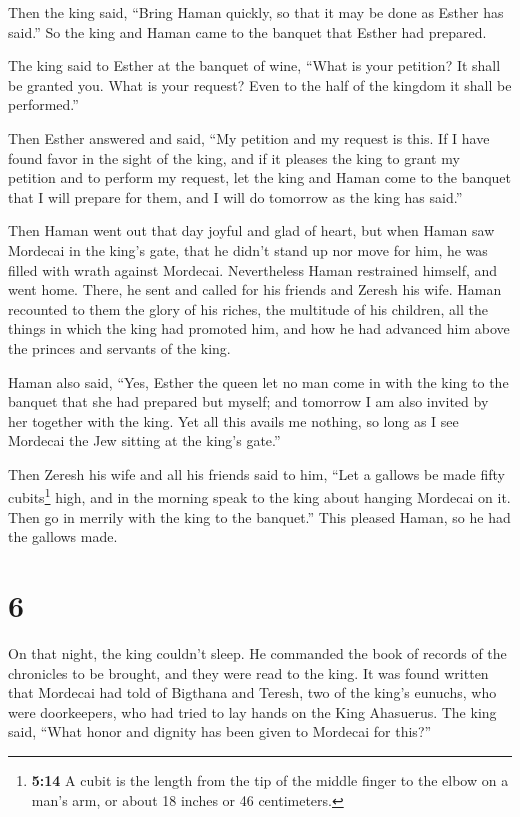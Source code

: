 Then the king said, ``Bring Haman quickly, so that it may
be done as Esther has said.'' So the king and Haman came to the banquet
that Esther had prepared.

 The king said to Esther at the banquet of wine, ``What is
your petition? It shall be granted you. What is your request? Even to
the half of the kingdom it shall be performed.''

 Then Esther answered and said, ``My petition and my
request is this.  If I have found favor in the sight of
the king, and if it pleases the king to grant my petition and to perform
my request, let the king and Haman come to the banquet that I will
prepare for them, and I will do tomorrow as the king has said.''

 Then Haman went out that day joyful and glad of heart,
but when Haman saw Mordecai in the king's gate, that he didn't stand up
nor move for him, he was filled with wrath against Mordecai.
 Nevertheless Haman restrained himself, and went home.
There, he sent and called for his friends and Zeresh his wife.
 Haman recounted to them the glory of his riches, the
multitude of his children, all the things in which the king had promoted
him, and how he had advanced him above the princes and servants of the
king.

 Haman also said, ``Yes, Esther the queen let no man come
in with the king to the banquet that she had prepared but myself; and
tomorrow I am also invited by her together with the king.
 Yet all this avails me nothing, so long as I see
Mordecai the Jew sitting at the king's gate.''

 Then Zeresh his wife and all his friends said to him,
``Let a gallows be made fifty cubits\footnote{\textbf{5:14} A cubit is
  the length from the tip of the middle finger to the elbow on a man's
  arm, or about 18 inches or 46 centimeters.} high, and in the morning
speak to the king about hanging Mordecai on it. Then go in merrily with
the king to the banquet.'' This pleased Haman, so he had the gallows
made.

\hypertarget{section-5}{%
\section{6}\label{section-5}}

 On that night, the king couldn't sleep. He commanded the
book of records of the chronicles to be brought, and they were read to
the king.  It was found written that Mordecai had told of
Bigthana and Teresh, two of the king's eunuchs, who were doorkeepers,
who had tried to lay hands on the King Ahasuerus.  The
king said, ``What honor and dignity has been given to Mordecai for
this?''

